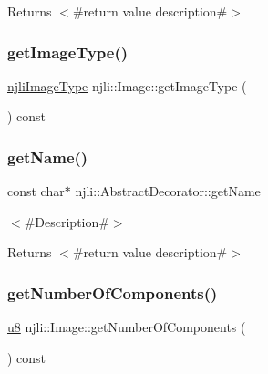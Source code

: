 \begin{DoxyReturn}{Returns}
$<$\#return value description\#$>$ 
\end{DoxyReturn}
\mbox{\label{classnjli_1_1_image_a0aa8b4efae3b78e51e757b58c6c63b6b}} 
\subsubsection{\texorpdfstring{get\+Image\+Type()}{getImageType()}}
{\footnotesize\ttfamily \mbox{\hyperlink{namespacenjli_a709a24b63b768ce1cdff54f7f48d3c0b}{njli\+Image\+Type}} njli\+::\+Image\+::get\+Image\+Type (\begin{DoxyParamCaption}{ }\end{DoxyParamCaption}) const}

\mbox{\label{classnjli_1_1_image_ad41266885be835f3ee602311e20877a4}} 
\subsubsection{\texorpdfstring{get\+Name()}{getName()}}
{\footnotesize\ttfamily const char$\ast$ njli\+::\+Abstract\+Decorator\+::get\+Name}

$<$\#\+Description\#$>$

\begin{DoxyReturn}{Returns}
$<$\#return value description\#$>$ 
\end{DoxyReturn}
\mbox{\label{classnjli_1_1_image_a490b9ccd20f362efca9c2a9b84563e34}} 
\subsubsection{\texorpdfstring{get\+Number\+Of\+Components()}{getNumberOfComponents()}}
{\footnotesize\ttfamily \mbox{\hyperlink{_util_8h_aed742c436da53c1080638ce6ef7d13de}{u8}} njli\+::\+Image\+::get\+Number\+Of\+Components (\begin{DoxyParamCaption}{ }\end{DoxyParamCaption}) const}

